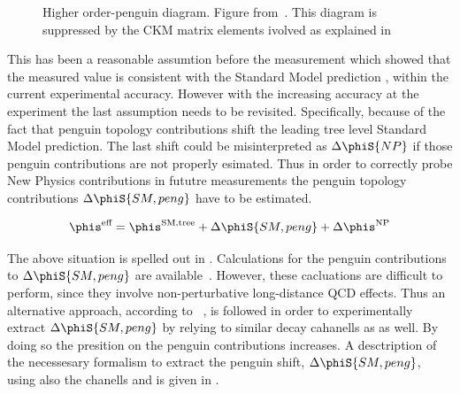 \begin{figure}[h]
  \centering
  {\sffamily }
  \caption{ Higher order-penguin diagram. Figure from~\cite{jeroenThesis}. This diagram is suppressed by the CKM matrix elements ivolved as explained in }
  \label{bs2jpsiphi_peng}
\end{figure}

This has been a reasonable assumtion before the \lhcb measurement which showed that the measured  value is consistent with the Standard
Model prediction , within the current experimental accuracy. However with the increasing accuracy at the \lhcb experiment the last assumption needs to be revisited.
Specifically, because of the fact that penguin topology contributions shift the leading tree level Standard Model prediction.
The last shift could be misinterpreted as $\Delta\phiS{NP}$ if those penguin contributions are not properly esimated.
Thus in order to correctly probe New Physics contributions in fututre measurements the penguin topology contributions $\Delta\phiS{SM,peng}$
have to be estimated.

\begin{equation}
\phis^{\text {eff}} = \phis^{\tiny \text{SM,tree}} + \Delta\phiS{SM,peng} + \Delta\phis^{\tiny \text{NP}}
 \label{phis_sm_peng}
\end{equation}

\noindent The above situation is spelled out in .
Calculations for the penguin contributions to $\Delta\phiS{SM,peng}$ are available~\cite{Liu:2013nea,Frings:2015eva}.
However, these cacluations are difficult to perform, since they involve non-perturbative long-distance QCD effects. Thus an alternative
approach, according to ~\cite{DeBruyn:2014oga,Frings:2015eva,Faller:2008gt,Liu:2013nea,DeBruyn-thesis}, is followed in order to experimentally extract $\Delta\phiS{SM,peng}$ by relying to
similar decay cahanells as \BsJpsiPhi as well. By doing so the presition on the penguin contributions increases. A desctription
of the necessesary formalism to extract the penguin shift, $\Delta\phiS{SM,peng}$, using also the chanells \BsJpsiKst and \BsJpsiRho is
given in .
